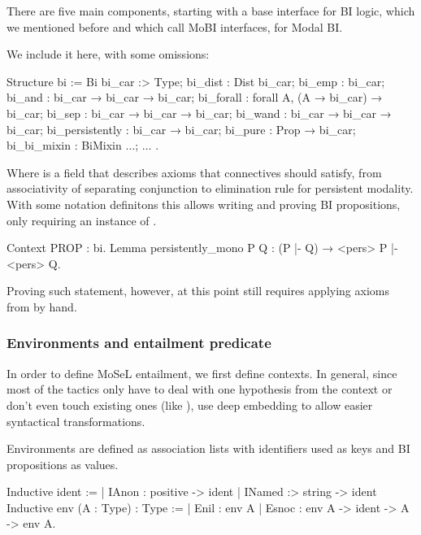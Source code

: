 There are five main components, starting with a base interface for BI logic, which we mentioned before and which \citet{krebbersMoSeLGeneralExtensible2018} call MoBI interfaces, for Modal BI.

We include it here, with some omissions:
\begin{coq}
Structure bi := Bi {
  bi_car :> Type;
  bi_dist : Dist bi_car;
  bi_emp : bi_car;
  bi_and : bi_car → bi_car → bi_car;
  bi_forall : forall A, (A → bi_car) → bi_car;
  bi_sep : bi_car → bi_car → bi_car;
  bi_wand : bi_car → bi_car → bi_car;
  bi_persistently : bi_car → bi_car;
  bi_pure : Prop → bi_car;
  bi_bi_mixin : BiMixin $\ldots$;
  $\ldots$
}.
\end{coq}

Where  is a field that describes axioms that connectives should satisfy, from associativity of separating conjunction to elimination rule for persistent modality.
With some notation definitons this allows writing and proving BI propositions, only requiring an instance of .

\begin{minipage}{\linewidth}
\begin{coq}
Context {PROP : bi}.
Lemma persistently_mono P Q : (P |- Q) → <pers> P |- <pers> Q.
\end{coq}
\end{minipage}

Proving such statement, however, at this point still requires applying axioms from  by hand.

\subsubsection{Environments and entailment predicate}
\label{subsubsec:environment-entailment-pred}

In order to define MoSeL entailment, we first define contexts.
In general, since most of the tactics only have to deal with one hypothesis from the context or don't even touch existing ones (like ), \citet{krebbersMoSeLGeneralExtensible2018} use deep embedding to allow easier syntactical transformations.

Environments are defined as association lists with identifiers used as keys and BI propositions as values.

\begin{coq}
Inductive ident :=
  | IAnon : positive -> ident
  | INamed :> string -> ident
Inductive env (A : Type) : Type :=
  | Enil : env A
  | Esnoc : env A -> ident -> A -> env A.
\end{coq}

